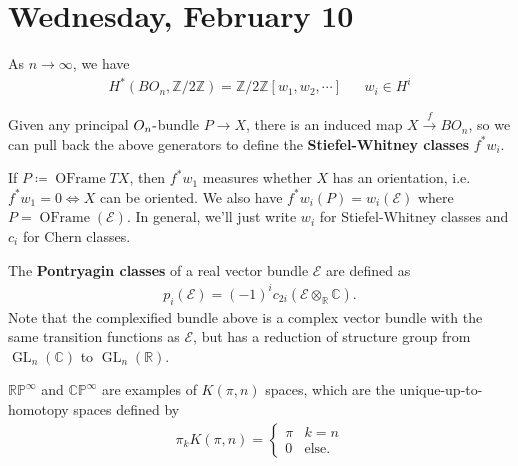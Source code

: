 \hypertarget{wednesday-february-10}{%
\section{Wednesday, February 10}\label{wednesday-february-10}}

\begin{theorem}[?]

As \(n\to \infty\), we have
\begin{align*}
H^*(BO_n, {\mathbb{Z}}/2{\mathbb{Z}}) = {\mathbb{Z}}/2{\mathbb{Z}}[w_1, w_2, \cdots]
&& w_i \in H^i
\end{align*}

\end{theorem}

\begin{definition}[?]

Given any principal \(O_n{\hbox{-}}\)bundle \(P\to X\), there is an
induced map \(X \xrightarrow{f} BO_n\), so we can pull back the above
generators to define the \textbf{Stiefel-Whitney classes} \(f^* w_i\).

\end{definition}

\begin{remark}

If \(P \coloneqq{\operatorname{OFrame}}TX\), then \(f^* w_1\) measures
whether \(X\) has an orientation, i.e.~\(f^* w_1 = 0 \iff X\) can be
oriented. We also have \(f^* w_i(P) = w_i( \mathcal{E} )\) where
\(P = {\operatorname{OFrame}}( \mathcal{E} )\). In general, we'll just
write \(w_i\) for Stiefel-Whitney classes and \(c_i\) for Chern classes.

\end{remark}

\begin{definition}

The \textbf{Pontryagin classes} of a real vector bundle \(\mathcal{E}\)
are defined as
\begin{align*}
p_i( \mathcal{E} ) = (-1)^i c_{2i}( \mathcal{E} \otimes_{\mathbb{R}}{\mathbb{C}})
.\end{align*}
Note that the complexified bundle above is a complex vector bundle with
the same transition functions as \(\mathcal{E}\), but has a reduction of
structure group from \(\operatorname{GL}_n({\mathbb{C}})\) to
\(\operatorname{GL}_n({\mathbb{R}})\).

\end{definition}

\begin{observation}

\({\mathbb{RP}}^{\infty }\) and \({\mathbb{CP}}^{\infty }\) are examples
of \(K(\pi, n)\) spaces, which are the unique-up-to-homotopy spaces
defined by
\begin{align*}
\pi_k K (\pi, n) = 
\begin{cases}
\pi &  k=n
\\
0 & \text{else}.
\end{cases}
\end{align*}

\end{observation}


